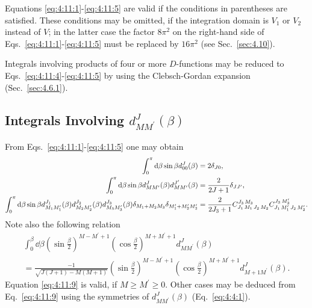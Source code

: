 Equations \eqref{eq:4:11:1}-\eqref{eq:4:11:5} are valid if the conditions in parentheses are satisfied. These conditions may be omitted, if the integration domain is $V_{1}$ or $V_{2}$ instead of $V$; in the latter case the factor $8 \pi^{2}$ on the right-hand side of Eqs.~\eqref{eq:4:11:1}-\eqref{eq:4:11:5} must be replaced by $16 \pi^{2}$ (see Sec.~\ref{sec:4.10}).

Integrals involving products of four or more $D$-functions may be reduced to Eqs.~\eqref{eq:4:11:4}-\eqref{eq:4:11:5} by using the Clebsch-Gordan expansion (Sec.~\ref{sec:4.6.1}).

\subsection{Integrals Involving $d_{M M^{\prime}}^{J}(\beta)$}\label{sec:4.11.2}
From Eqs.~\eqref{eq:4:11:1}-\eqref{eq:4:11:5} one may obtain
\begin{align}
\int_{0}^{\pi} \mathrm{d} \beta \sin \beta d_{00}^{J}(\beta)&=2 \delta_{J 0} , \label{eq:4:11:6}\\
\int_{0}^{\pi} \mathrm{d} \beta \sin \beta d_{M M^{\prime}}^{J}(\beta) d_{M M^{\prime}}^{J^{\prime}}(\beta)&=\frac{2}{2 J+1} \delta_{J J^{\prime}} , \label{eq:4:11:7}\\
\int_{0}^{\pi} \mathrm{d} \beta \sin \beta d_{M_{1} M_{1}^{\prime}}^{J_{1}}(\beta) d_{M_{2} M_{2}^{\prime}}^{J_{2}}(\beta) d_{M_{3} M_{3}^{\prime}}^{J_{3}}(\beta) \delta_{M_{1}+M_{2} M_{3}} \delta_{M_{1}^{\prime}+M_{2}^{\prime} M_{3}^{\prime}}&=\frac{2}{2 J_{3}+1} C_{J_{1}\,M_{1}\,J_{2}\,M_{2}}^{J_{3}\,M_{3}} C_{J_{1}\,M_{1}^{\prime}\,J_{2}\,M_{2}^{\prime}}^{J_{3}\,M_{3}^{\prime}} .\label{eq:4:11:8}
\end{align}
Note also the following relation
\begin{multline}
 \int_{0}^{\beta} \dd \beta\left(\sin \frac{\beta}{2}\right)^{M-M^{\prime}+1}\left(\cos \frac{\beta}{2}\right)^{M+M^{\prime}+1} d_{M M^{\prime}}^{J}(\beta)  \\
 =\frac{-1}{\sqrt{J(J+1)-M(M+1)}}\left(\sin \frac{\beta}{2}\right)^{M-M^{\prime}+1}\left(\cos \frac{\beta}{2}\right)^{M+M^{\prime}+1} d_{M+1 M^{\prime}}^{J}(\beta). \label{eq:4:11:9}
\end{multline}
Equation \eqref{eq:4:11:9} is valid, if $M \geq M^{\prime} \geq 0$. Other cases may be deduced from Eq.~\eqref{eq:4:11:9} using the symmetries of $d_{M M^{\prime}}^{J}(\beta)$ (Eq.~\eqref{eq:4:4:1}).

